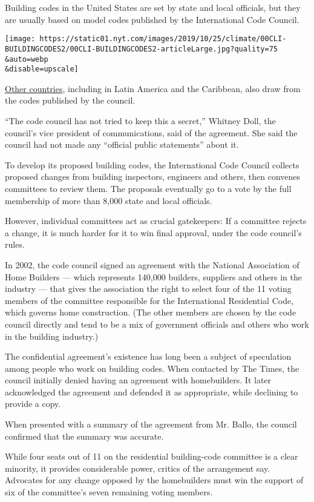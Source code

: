 Building codes in the United States are set by state and local
officials, but they are usually based on model codes published by the
International Code Council.

\texttt{[image: https://static01.nyt.com/images/2019/10/25/climate/00CLI-BUILDINGCODES2/00CLI-BUILDINGCODES2-articleLarge.jpg?quality=75\\\&auto=webp\\\&disable=upscale]}

\href{https://www.iccsafe.org/international-code-adoptions/}{Other
countries}, including in Latin America and the Caribbean, also draw from
the codes published by the council.

``The code council has not tried to keep this a secret,'' Whitney Doll,
the council's vice president of communications, said of the agreement.
She said the council had not made any ``official public statements''
about it.

To develop its proposed building codes, the International Code Council
collects proposed changes from building inspectors, engineers and
others, then convenes committees to review them. The proposals
eventually go to a vote by the full membership of more than 8,000 state
and local officials.

However, individual committees act as crucial gatekeepers: If a
committee rejects a change, it is much harder for it to win final
approval, under the code council's rules.

In 2002, the code council signed an agreement with the National
Association of Home Builders --- which represents 140,000 builders,
suppliers and others in the industry --- that gives the association the
right to select four of the 11 voting members of the committee
responsible for the International Residential Code, which governs home
construction. (The other members are chosen by the code council directly
and tend to be a mix of government officials and others who work in the
building industry.)

The confidential agreement's existence has long been a subject of
speculation among people who work on building codes. When contacted by
The Times, the council initially denied having an agreement with
homebuilders. It later acknowledged the agreement and defended it as
appropriate, while declining to provide a copy.

When presented with a summary of the agreement from Mr. Ballo, the
council confirmed that the summary was accurate.

While four seats out of 11 on the residential building-code committee is
a clear minority, it provides considerable power, critics of the
arrangement say. Advocates for any change opposed by the homebuilders
must win the support of six of the committee's seven remaining voting
members.

